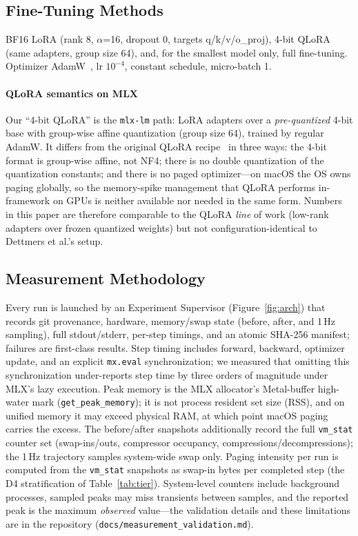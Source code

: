 \documentclass[10pt,twocolumn]{article}
\begin{document}
\subsection{Fine-Tuning Methods}
\label{sec:qlorasem}
BF16 LoRA (rank 8, $\alpha$=16, dropout 0, targets q/k/v/o\_proj), 4-bit QLoRA
(same adapters, group size 64), and, for the smallest model only, full
fine-tuning. Optimizer AdamW~\cite{loshchilov2019adamw}, lr $10^{-4}$,
constant schedule, micro-batch 1.

\paragraph{QLoRA semantics on MLX}
Our ``4-bit QLoRA'' is the \texttt{mlx-lm} path: LoRA adapters over a
\emph{pre-quantized} 4-bit base with group-wise affine quantization
(group size 64), trained by regular AdamW. It differs from the original
QLoRA recipe~\cite{dettmers2023qlora} in three ways: the 4-bit format is
group-wise affine, not NF4; there is no double quantization of the
quantization constants; and there is no paged optimizer---on macOS the
OS owns paging globally, so the memory-spike management that QLoRA
performs in-framework on GPUs is neither available nor needed in the
same form. Numbers in this paper are therefore comparable to the QLoRA
\emph{line} of work (low-rank adapters over frozen quantized weights)
but not configuration-identical to Dettmers et al.'s setup.

\subsection{Measurement Methodology}
\label{sec:measurements}
Every run is launched by an Experiment Supervisor
(Figure~\ref{fig:arch}) that records git provenance,
hardware, memory/swap state (before, after, and 1\,Hz sampling), full
stdout/stderr, per-step timings, and an atomic SHA-256 manifest; failures are
first-class results. Step timing includes forward, backward, optimizer update,
and an explicit \texttt{mx.eval} synchronization; we measured that omitting
this synchronization under-reports step time by three orders of magnitude
under MLX's lazy execution. Peak memory is the MLX allocator's Metal-buffer
high-water mark (\texttt{get\_peak\_memory}); it is not process resident set size (RSS), and on
unified memory it may exceed physical RAM, at which point macOS paging carries
the excess. The before/after snapshots additionally record the full
\texttt{vm\_stat} counter set (swap-ins/outs, compressor occupancy,
compressions/decompressions); the 1\,Hz trajectory samples system-wide swap
only. Paging intensity per run is computed from the \texttt{vm\_stat}
snapshots as swap-in bytes per completed step (the D4 stratification of
Table~\ref{tab:tier}). System-level counters include background processes,
sampled peaks may miss transients between samples, and the reported peak is
the maximum \emph{observed} value---the validation details and these
limitations are in the repository
(\texttt{docs/measurement\_validation.md}).
\end{document}
